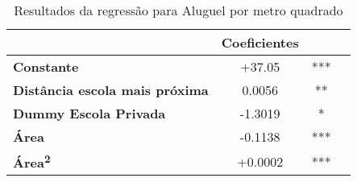 \begin{table}[h]
    \centering
    \begin{tabular}{lccc}
        \hline
        & \textbf{Coeficientes} &  \\
        \hline
        \textbf{Constante} & +37.05  & *** \\
        \textbf{Distância escola mais próxima} & 0.0056  & **\\
        \textbf{Dummy Escola Privada} & -1.3019  & *  \\
        \textbf{Área} & -0.1138  & *** \\
        \textbf{Área\textsuperscript{2}} & +0.0002  & *** \\
        \hline
    \end{tabular}
    \caption{Resultados da regressão para Aluguel por metro quadrado}
    \label{tab:regressao}
\end{table}
